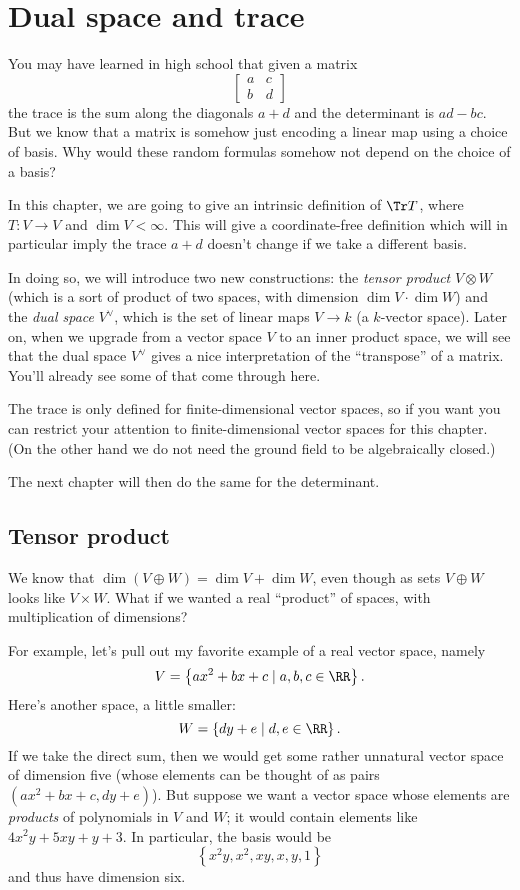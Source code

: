 \chapter{Dual space and trace}
You may have learned in high school that given a matrix
\[
	\begin{bmatrix}
		a & c \\
		b & d
	\end{bmatrix}
\]
the trace is the sum along the diagonals $a+d$
and the determinant is $ad-bc$.
But we know that a matrix is somehow
just encoding a linear map using a choice of basis.
Why would these random formulas somehow not
depend on the choice of a basis?

In this chapter, we are going to
give an intrinsic definition of $\Tr T$,
where $T \colon V \to V$ and $\dim V < \infty$.
This will give a coordinate-free definition
which will in particular imply the trace $a+d$
doesn't change if we take a different basis.

In doing so, we will introduce two new constructions:
the \emph{tensor product} $V \otimes W$
(which is a sort of product of two spaces,
with dimension $\dim V \cdot \dim W$)
and the \emph{dual space} $V^\vee$,
which is the set of linear maps $V \to k$ (a $k$-vector space).
Later on, when we upgrade from a vector space $V$
to an inner product space,
we will see that the dual space $V^\vee$ gives a nice
interpretation of the ``transpose'' of a matrix.
You'll already see some of that come through here.

The trace is only defined for finite-dimensional
vector spaces, so if you want you can restrict
your attention to finite-dimensional vector spaces for this chapter.
(On the other hand we do not need the
ground field to be algebraically closed.)

The next chapter will then do the same for the determinant.

\section{Tensor product}
We know that $\dim (V \oplus W) = \dim V + \dim W$,
even though as sets $V \oplus W$ looks like $V \times W$.
What if we wanted a real ``product'' of spaces,
with multiplication of dimensions?

For example, let's pull out
my favorite example of a real vector space, namely
\[ V = \left\{ ax^2 + bx + c \mid a,b,c \in \RR \right\}. \]
Here's another space, a little smaller:
\[ W = \left\{ dy + e \mid d,e \in \RR \right\}. \]
If we take the direct sum, then we would get some rather unnatural
vector space of dimension five
(whose elements can be thought of as pairs $(ax^2+bx+c,dy+e)$).
But suppose we want a vector space
whose elements are \emph{products} of polynomials in $V$ and $W$;
it would contain elements like $4x^2y + 5xy + y + 3$.
In particular, the basis would be
\[ \left\{ x^2y, x^2, xy, x, y, 1 \right\} \]
and thus have dimension six.

